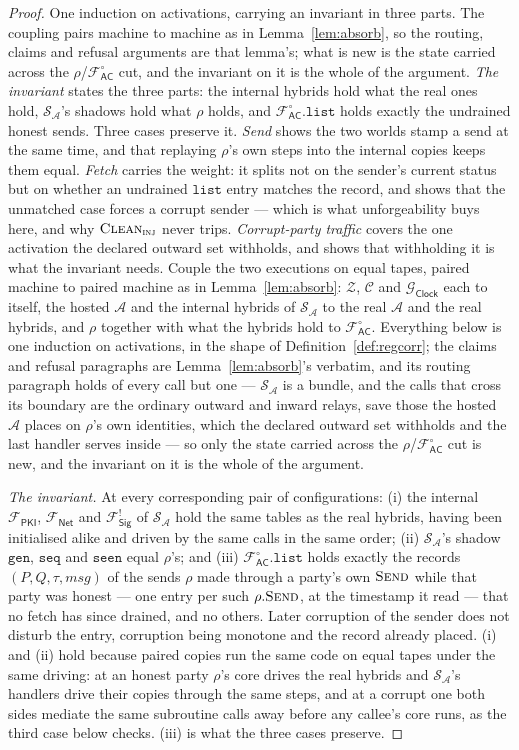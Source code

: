 \documentclass[10pt,oneside,openany]{book}
\newcommand{\Corr}{\mathcal{C}}
\newcommand{\Zenv}{\mathcal{Z}}
\newcommand{\Adv}{\mathcal{A}}
\newcommand{\Sim}{\mathcal{S}}
\newcommand{\op}[1]{\textnormal{\textsc{#1}}}
\newcommand{\Fsig}{\mathcal{F}_{\mathsf{Sig}}}
\newcommand{\Gclock}{\mathcal{G}_{\mathsf{Clock}}}
\newcommand{\Fnet}{\mathcal{F}_{\mathsf{Net}}}
\newcommand{\Facz}{\mathcal{F}^{\circ}_{\mathsf{AC}}}
\newcommand{\Fpki}{\mathcal{F}_{\mathsf{PKI}}}
\newcommand{\msg}{\mathit{msg}}
\newcommand{\Clean}{\op{Clean}}
\newcommand{\V}[1]{\mathtt{#1}}
\theoremstyle{accentdef}
\theoremstyle{accentplain}
\begin{document}
\begin{proof}
One induction on activations, carrying an invariant in three parts. The coupling pairs machine to
machine as in Lemma~\ref{lem:absorb}, so the routing, claims and refusal arguments are that
lemma's; what is new is the state carried across the $\rho$/$\Facz$ cut, and the invariant on it is
the whole of the argument. \emph{The invariant} states the three parts: the internal hybrids hold
what the real ones hold, $\Sim_{\Adv}$'s shadows hold what $\rho$ holds, and $\Facz.\V{list}$ holds
exactly the undrained honest sends. Three cases preserve it. \emph{Send} shows the two worlds stamp
a send at the same time, and that replaying $\rho$'s own steps into the internal copies keeps them
equal. \emph{Fetch} carries the weight: it splits not on the sender's current status but on whether
an undrained $\V{list}$ entry matches the record, and shows that the unmatched case forces a
corrupt sender --- which is what unforgeability buys here, and why $\Clean_{\op{inj}}$ never trips.
\emph{Corrupt-party traffic} covers the one activation the declared outward set withholds, and
shows that withholding it is what the invariant needs.
Couple the two executions on equal tapes, paired machine to paired machine as in
Lemma~\ref{lem:absorb}: $\Zenv$, $\Corr$ and $\Gclock$ each to itself, the hosted $\Adv$ and the
internal hybrids of $\Sim_{\Adv}$ to the real $\Adv$ and the real hybrids, and $\rho$ together
with what the hybrids hold to $\Facz$. Everything below is one induction on activations, in the
shape of Definition~\ref{def:regcorr}; the claims and refusal paragraphs are
Lemma~\ref{lem:absorb}'s verbatim, and its routing paragraph holds of every call but one ---
$\Sim_{\Adv}$ is a bundle, and the calls that cross its boundary are the ordinary outward and
inward relays, save those the hosted $\Adv$ places on $\rho$'s own identities, which the declared
outward set withholds and the last handler serves inside --- so only the state carried across the
$\rho$/$\Facz$ cut is new, and the invariant on it is the whole of the argument.

\emph{The invariant.} At every corresponding pair of configurations: (i) the internal $\Fpki$,
$\Fnet$ and $\Fsig^{!}$ of $\Sim_{\Adv}$ hold the same tables as the real hybrids, having been
initialised alike and driven by the same calls in the same order; (ii) $\Sim_{\Adv}$'s shadow
$\V{gen}$, $\V{seq}$ and $\V{seen}$ equal $\rho$'s; and (iii) $\Facz.\V{list}$ holds exactly the
records $(P,Q,\tau,\msg)$ of the sends $\rho$ made through a party's own $\op{Send}$ while that
party was honest --- one entry per such $\rho.\op{Send}$, at the timestamp it read --- that no
fetch has since drained, and no others. Later corruption of the sender does not disturb the entry,
corruption being monotone and the record already placed. (i) and (ii) hold because paired copies
run the same code on equal tapes under the same driving: at an honest party $\rho$'s core drives
the real hybrids and $\Sim_{\Adv}$'s handlers drive their copies through the same steps, and at a
corrupt one both sides mediate the same subroutine calls away before any callee's core runs, as
the third case below checks. (iii) is what the three cases preserve.


\end{proof}
\end{document}

